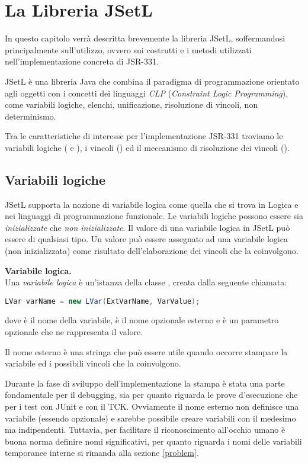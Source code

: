 \chapter{La Libreria JSetL}\label{jsetl}
In questo capitolo verrà descritta brevemente la libreria JSetL, soffermandosi
principalmente sull'utilizzo, ovvero sui costrutti e i metodi utilizzati
nell'implementazione concreta di JSR-331. 

JSetL è una libreria Java che combina il paradigma di programmazione orientato 
agli oggetti con i concetti dei linguaggi \emph{CLP} (\emph{Constraint Logic 
Programming}), 
come variabili logiche, elenchi,
unificazione, risoluzione di vincoli, non determinismo.

Tra le caratteristiche di interesse per l'implementazione JSR-331 troviamo le
variabili logiche ( e ), i vincoli 
() ed il meccanismo di risoluzione dei vincoli 
().

\section{Variabili logiche}
JSetL supporta la nozione di variabile logica come quella che si trova in
Logica e nei linguaggi di programmazione funzionale. Le variabili logiche 
possono essere sia \emph{inizializzate} che \emph{non inizializzate}.
Il valore di una variabile logica in JSetL può essere di qualsiasi tipo.
Un valore può essere assegnato ad una variabile logica (non inizializzata) come
risultato dell'elaborazione dei vincoli che la coinvolgono.

\begin{flushleft}\textbf{Variabile logica.}\\
Una \emph{variabile logica} è un'istanza della classe , creata
dalla seguente chiamata:
\begin{center}
\lstinline[language = Java]$LVar varName = new LVar(ExtVarName, VarValue);$
\end{center}
dove  è il nome della variabile,  è il nome
opzionale esterno e  è un parametro opzionale che ne
rappresenta il valore.
\end{flushleft}

Il nome esterno è una stringa che può essere utile quando occorre stampare la
variabile ed i possibili vincoli che la coinvolgono. 

\begin{nota}
Durante la fase di sviluppo dell'implementazione la stampa è stata una parte 
fondamentale per il debugging, sia per quanto riguarda le prove d'esecuzione che
per i test con JUnit e con il TCK. Ovviamente il nome esterno non definisce
una variabile (essendo opzionale) e sarebbe possibile creare variabili con
il medesimo  ma indipendenti. Tuttavia, per 
facilitare il riconoscimento all'occhio umano è buona norma definire nomi
significativi, per quanto riguarda i nomi delle variabili temporanee interne
si rimanda alla sezione \ref{problem}.
\end{nota}

